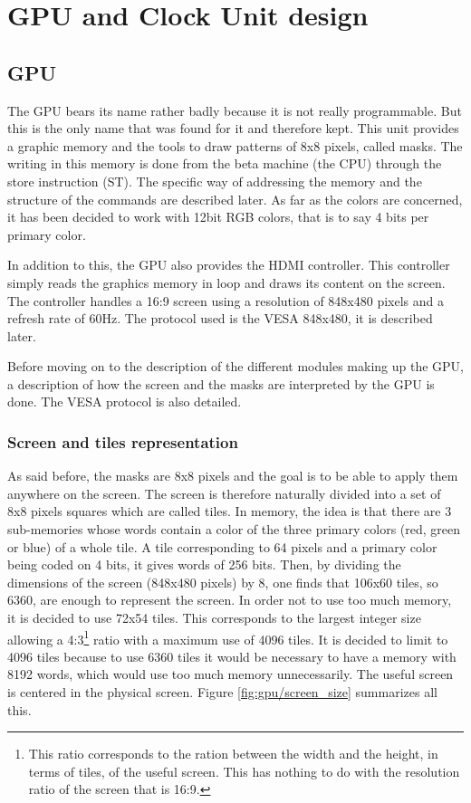 \chapter{GPU and Clock Unit design}

\section{GPU}
The GPU bears its name rather badly because it is not really programmable. But this is the only name 
that was found for it and therefore kept. This unit provides a 
graphic memory and the tools to draw patterns of 8x8 pixels, called masks. The writing in this 
memory is done from the beta machine (the CPU) through the store instruction (ST). The specific way 
of addressing the memory and the structure of the commands are described later. As far as the colors 
are concerned, it has been decided to work with 12bit RGB colors, that is to say 4 bits per primary 
color.

In addition to this, the GPU also provides the HDMI controller. This controller simply reads the 
graphics memory in loop and draws its content on the screen. The controller handles a 
16:9 screen using a resolution of 848x480 pixels and a refresh rate of 60Hz. The protocol used is 
the VESA 848x480, it is described later. 

Before moving on to the description of the different modules making up the GPU, a description of 
how the screen and the masks are interpreted by the GPU is done. The VESA protocol is also detailed.

\subsection{Screen and tiles representation}

As said before, the masks are 8x8 pixels and the goal is to be able to apply them anywhere on the 
screen. 
The screen is therefore naturally divided into a set of 8x8 pixels squares which are called tiles. 
In memory, the idea is that there are 3 sub-memories whose words contain a color of the three 
primary colors (red, green or blue) of a whole tile. A tile corresponding to 64 pixels and a 
primary color being coded on 4 bits, it gives words of 256 bits. Then, by dividing the dimensions 
of the screen (848x480 pixels) by 8, one finds that 106x60 tiles, so 6360, are enough to represent 
the screen. In order not to use too much memory, it is decided to use 72x54 tiles. This corresponds 
to the largest integer size allowing a 4:3\footnote{This ratio corresponds to the ration between the
width and the height, in terms of tiles, of the useful screen. This has nothing to do with the 
resolution ratio of the screen that is 16:9.} ratio with a maximum use of 4096 tiles.  It is decided 
to limit to 4096 tiles because to use 6360 tiles it would be necessary to have a memory with 8192 
words, which would use too much memory unnecessarily. The useful screen is centered in the physical 
screen. Figure \ref{fig:gpu/screen_size} summarizes all this.

